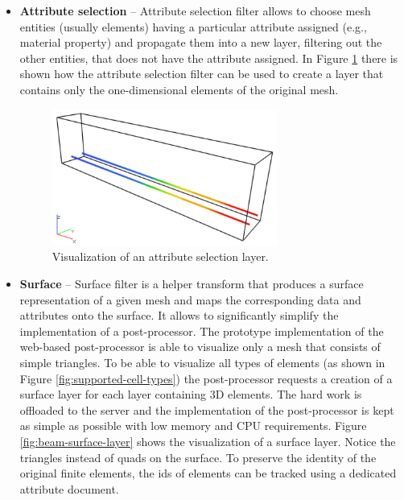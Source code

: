 \begin{itemize}
    \item \textbf{Attribute selection} -- Attribute selection filter allows to choose mesh entities (usually elements) having a particular attribute assigned (e.g., material property) and propagate them into a new layer, filtering out the other entities, that does not have the attribute assigned. In Figure \ref{fig:beam-attribute-selection-layer} there is shown how the attribute selection filter can be used to create a layer that contains only the one-dimensional elements of the original mesh.
    
    \begin{figure}[H]
        \centering
        \includegraphics[width=0.7\textwidth]{figures/chapter-data-management/beam-attribute-selection-layer}
        \decoRule
        \caption{Visualization of an attribute selection layer.}
        \label{fig:beam-attribute-selection-layer}
    \end{figure}

    \item \textbf{Surface} -- Surface filter is a helper transform that produces a surface representation of a given mesh and maps the corresponding data and attributes onto the surface. It allows to significantly simplify the implementation of a post-processor. The prototype implementation of the web-based post-processor is able to visualize only a mesh that consists of simple triangles. To be able to visualize all types of elements (as shown in Figure \ref{fig:supported-cell-types}) the post-processor requests a creation of a surface layer for each layer containing 3D elements. The hard work is offloaded to the server and the implementation of the post-processor is kept as simple as possible with low memory and CPU requirements. Figure \ref{fig:beam-surface-layer} shows the visualization of a surface layer. Notice the triangles instead of quads on the surface. To preserve the identity of the original finite elements, the ids of elements can be tracked using a dedicated attribute document.


\end{itemize}
